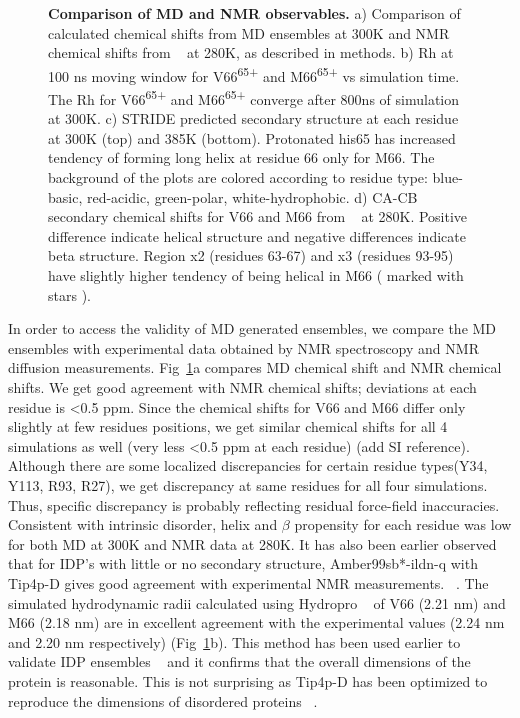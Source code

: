 \documentclass[journal=jacsat,manuscript=article]{achemso}
\begin{document}
\begin{figure}[!ht]
\caption{{\bf Comparison of MD and NMR observables.} a) Comparison of calculated chemical shifts from MD ensembles at 300K and NMR chemical shifts from ~\cite{Anastasia2013}  at 280K,  as described in methods. b) Rh at 100 ns moving  window for V66\textsuperscript{65+} and M66\textsuperscript{65+} vs simulation time. The Rh for V66\textsuperscript{65+} and M66\textsuperscript{65+} converge after 800ns of simulation at 300K. c) STRIDE predicted secondary structure at each residue at 300K (top) and 385K (bottom).  Protonated his65 has increased tendency of forming long helix at residue 66 only for M66. The background of the plots are colored according to residue type: blue-basic, red-acidic, green-polar, white-hydrophobic. d) CA-CB secondary chemical shifts for V66 and M66 from  ~\cite{Anastasia2013}  at 280K. Positive difference indicate helical structure and negative differences indicate beta structure. Region x2 (residues 63-67) and x3 (residues 93-95) have slightly higher tendency of being helical in M66 ( marked with stars ).}
\label{fig2} 
\end{figure}

In order to access the validity of MD generated ensembles, we compare the MD ensembles with experimental data obtained by NMR spectroscopy and NMR diffusion measurements. Fig~\ref{fig2}a compares MD chemical shift and NMR chemical shifts. We get good agreement with NMR chemical shifts; deviations at each residue is \textless 0.5 ppm. Since the chemical shifts for V66 and M66 differ only slightly at few residues positions, we get similar chemical shifts for all 4 simulations as well (very less  \textless 0.5 ppm at each residue) (add SI reference). 
Although there are some localized discrepancies for certain residue types(Y34, Y113, R93, R27), we get discrepancy at same residues for all four simulations. Thus, specific discrepancy is probably reflecting residual force-field inaccuracies. Consistent with intrinsic disorder, helix and $\beta$ propensity for each residue was low for both MD at 300K and NMR data at 280K. It has also been earlier observed that for IDP's with little or no secondary structure,  Amber99sb*-ildn-q with Tip4p-D gives good agreement with experimental NMR measurements. ~\cite {Robustelli2018}.
The simulated hydrodynamic radii calculated using Hydropro ~\cite {Ortega2011} of V66 (2.21 nm) and M66 (2.18 nm) are in excellent agreement with the experimental values (2.24 nm and 2.20 nm respectively) (Fig~\ref{fig2}b). This method has been used earlier to validate IDP ensembles ~\cite {Rauscher2015, Meng2018} and it confirms that the overall dimensions of the protein is reasonable.  This is not surprising as Tip4p-D has been optimized to reproduce the dimensions of disordered proteins ~\cite {Piana2015, Robustelli2018}. 
\end{document}
